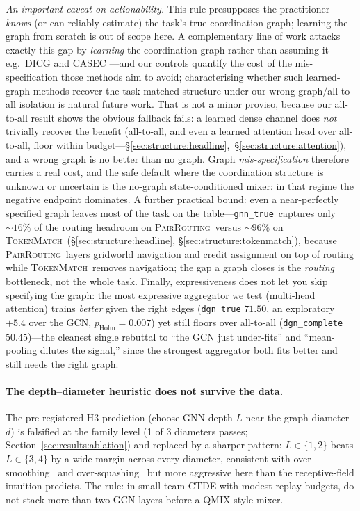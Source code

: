 \documentclass[manuscript, screen, review]{jair}
\providecommand{\citep}{\parencite}
\newcommand{\algoname}[1]{\textsc{#1}}
\newcommand{\gtrue}{\texttt{gnn\_true}}
\newcommand{\pairrouting}{\textsc{PairRouting}}
\newcommand{\tokenmatch}{\textsc{TokenMatch}}
\begin{document}
\emph{An important caveat on actionability.} This rule presupposes the
practitioner \emph{knows} (or can reliably estimate) the task's true
coordination graph; learning the graph from scratch is out of scope here. A
complementary line of work attacks exactly this gap by \emph{learning} the
coordination graph rather than assuming it---e.g.\ \algoname{DICG}
\citep{li_2021_dicg} and \algoname{CASEC} \citep{wang_2022_casec}---and our
controls quantify the cost of the mis-specification those methods aim to avoid;
characterising whether such learned-graph methods recover the task-matched
structure under our wrong-graph/all-to-all isolation is natural future work. That
is not a minor proviso, because our all-to-all result shows the obvious
fallback fails: a learned dense channel does \emph{not} trivially recover the
benefit (all-to-all, and even a learned attention head over all-to-all, floor
within budget---\S\ref{sec:structure:headline},~\S\ref{sec:structure:attention}),
and a wrong graph is no better than no graph. Graph \emph{mis-specification}
therefore carries a real cost, and the safe default where the coordination
structure is unknown or uncertain is the no-graph state-conditioned mixer: in
that regime the negative endpoint dominates. A further practical bound: even a
near-perfectly specified graph leaves most of the task on the table---\gtrue\
captures only ${\sim}16\%$ of the routing headroom on \pairrouting\ versus
${\sim}96\%$ on \tokenmatch\ (\S\ref{sec:structure:headline},
\S\ref{sec:structure:tokenmatch}), because \pairrouting\ layers gridworld
navigation and credit assignment on top of routing while \tokenmatch\ removes
navigation; the gap a graph closes is the \emph{routing} bottleneck, not the
whole task. Finally, expressiveness does not let you skip specifying the graph:
the most expressive aggregator we test (multi-head attention) trains
\emph{better} given the right edges (\texttt{dgn\_true} $71.50$, an
exploratory $+5.4$ over the GCN, $p_{\text{Holm}}=0.007$) yet still floors
over all-to-all
(\texttt{dgn\_complete} $50.45$)---the cleanest single rebuttal to ``the GCN
just under-fits'' and ``mean-pooling dilutes the signal,'' since the strongest
aggregator both fits better and still needs the right graph.

\paragraph{The depth--diameter heuristic does not survive the data.} The
pre-registered H3 prediction (choose GNN depth $L$ near the graph
diameter $d$) is falsified at the family level (1 of 3 diameters passes;
Section~\ref{sec:results:ablation}) and replaced by a sharper pattern:
$L\in\{1,2\}$ beats $L\in\{3,4\}$ by a wide margin across every diameter,
consistent with over-smoothing~\citep{li_2018_oversmoothing} and
over-squashing~\citep{alon_2021_oversquashing} but more aggressive here than the
receptive-field intuition predicts. The rule: in small-team CTDE with
modest replay budgets, do not stack more than two GCN layers before a
QMIX-style mixer.
\end{document}
